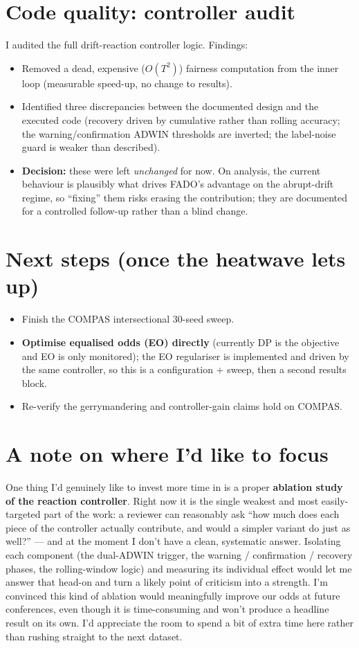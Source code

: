 \documentclass[11pt,a4paper]{article}
\begin{document}
\section{Code quality: controller audit}
I audited the full drift-reaction controller logic. Findings:
\begin{itemize}
  \item Removed a dead, expensive ($O(T^2)$) fairness computation from the inner loop
        (measurable speed-up, no change to results).
  \item Identified three discrepancies between the documented design and the executed code
        (recovery driven by cumulative rather than rolling accuracy; the warning/confirmation
        ADWIN thresholds are inverted; the label-noise guard is weaker than described).
  \item \textbf{Decision:} these were left \emph{unchanged} for now. On analysis, the current
        behaviour is plausibly what drives FADO's advantage on the abrupt-drift regime, so
        ``fixing'' them risks erasing the contribution; they are documented for a controlled
        follow-up rather than a blind change.
\end{itemize}

\section{Next steps (once the heatwave lets up)}
\begin{itemize}
  \item Finish the \textsc{COMPAS} intersectional 30-seed sweep.
  \item \textbf{Optimise equalised odds (EO) directly} (currently DP is the objective and EO is
        only monitored); the EO regulariser is implemented and driven by the same controller,
        so this is a configuration + sweep, then a second results block.
  \item Re-verify the gerrymandering and controller-gain claims hold on \textsc{COMPAS}.
\end{itemize}

\section*{A note on where I'd like to focus}
One thing I'd genuinely like to invest more time in is a proper \textbf{ablation study of the
reaction controller}. Right now it is the single weakest and most easily-targeted part of the
work: a reviewer can reasonably ask ``how much does each piece of the controller actually
contribute, and would a simpler variant do just as well?'' --- and at the moment I don't have a
clean, systematic answer. Isolating each component (the dual-ADWIN trigger, the warning /
confirmation / recovery phases, the rolling-window logic) and measuring its individual effect
would let me answer that head-on and turn a likely point of criticism into a strength. I'm
convinced this kind of ablation would meaningfully improve our odds at future conferences, even
though it is time-consuming and won't produce a headline result on its own. I'd appreciate the
room to spend a bit of extra time here rather than rushing straight to the next dataset.
\end{document}
